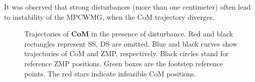 It was observed that strong disturbances (more than one centimeter) often lead to 
instability of the \ac{MPCWMG}, when the \ac{CoM} trajectory diverges. 

\begin{figure}[!ht]
    \centering
\caption[Trajectories of {\bf CoM} in the presence of disturbance]{Trajectories of 
{\bf CoM} in the presence of disturbance. Red and black rectangles represent \ac{SS}, 
\ac{DS} are omitted. Blue and black curves show trajectories of \ac{CoM} and \ac{ZMP}, 
respectively. Black circles stand for reference \ac{ZMP} positions. Green boxes are 
the footstep reference points. The red stars indicate infeasible \ac{CoM} positions.}
\label{fig.sim_dist}
\end{figure}


